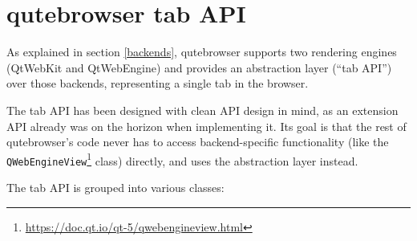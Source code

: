 \documentclass[a4paper,parskip=full]{scrreprt}
\begin{document}
\section{qutebrowser tab API}
\label{tabapi}

As explained in section \ref{backends}, qutebrowser supports two rendering
engines (QtWebKit and QtWebEngine) and provides an abstraction layer (``tab
API'') over those backends, representing a single tab in the browser.

The tab API has been designed with clean API design in mind, as an extension API
already was on the horizon when implementing it. Its goal is that the rest of
qutebrowser's code never has to access backend-specific functionality (like the
\verb|QWebEngineView|\footnote{\url{https://doc.qt.io/qt-5/qwebengineview.html}}
class) directly, and uses the abstraction layer instead.

The tab API is grouped into various classes:
\end{document}
